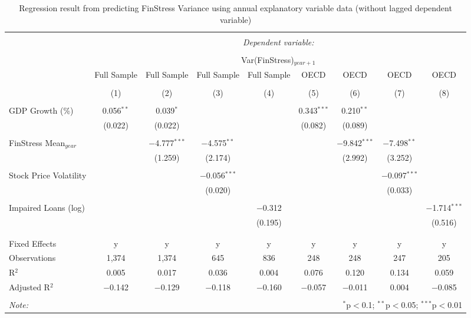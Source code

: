 
\begin{table}[!htbp] \centering 
  \caption{Regression result from predicting FinStress Variance using annual explanatory variable data (without lagged dependent variable)} 
  \label{annual_reg_nolag_dv} 
\tiny 
\begin{tabular}{@{\extracolsep{5pt}}lcccccccc} 
\\[-1.8ex]\hline 
\hline \\[-1.8ex] 
 & \multicolumn{8}{c}{\textit{Dependent variable:}} \\ 
\cline{2-9} 
\\[-1.8ex] & \multicolumn{8}{c}{Var(FinStress)$_{year+1}$} \\ 
 & Full Sample & Full Sample & Full Sample & Full Sample & OECD & OECD & OECD & OECD \\ 
\\[-1.8ex] & (1) & (2) & (3) & (4) & (5) & (6) & (7) & (8)\\ 
\hline \\[-1.8ex] 
 GDP Growth (\%) & 0.056$^{**}$ & 0.039$^{*}$ &  &  & 0.343$^{***}$ & 0.210$^{**}$ &  &  \\ 
  & (0.022) & (0.022) &  &  & (0.082) & (0.089) &  &  \\ 
  & & & & & & & & \\ 
 FinStress Mean$_{year}$ &  & $-$4.777$^{***}$ & $-$4.575$^{**}$ &  &  & $-$9.842$^{***}$ & $-$7.498$^{**}$ &  \\ 
  &  & (1.259) & (2.174) &  &  & (2.992) & (3.252) &  \\ 
  & & & & & & & & \\ 
 Stock Price Volatility &  &  & $-$0.056$^{***}$ &  &  &  & $-$0.097$^{***}$ &  \\ 
  &  &  & (0.020) &  &  &  & (0.033) &  \\ 
  & & & & & & & & \\ 
 Impaired Loans (log) &  &  &  & $-$0.312 &  &  &  & $-$1.714$^{***}$ \\ 
  &  &  &  & (0.195) &  &  &  & (0.516) \\ 
  & & & & & & & & \\ 
\hline \\[-1.8ex] 
Fixed Effects & y & y & y & y & y & y & y & y \\ 
Observations & 1,374 & 1,374 & 645 & 836 & 248 & 248 & 247 & 205 \\ 
R$^{2}$ & 0.005 & 0.017 & 0.036 & 0.004 & 0.076 & 0.120 & 0.134 & 0.059 \\ 
Adjusted R$^{2}$ & $-$0.142 & $-$0.129 & $-$0.118 & $-$0.160 & $-$0.057 & $-$0.011 & 0.004 & $-$0.085 \\ 
\hline 
\hline \\[-1.8ex] 
\textit{Note:}  & \multicolumn{8}{r}{$^{*}$p$<$0.1; $^{**}$p$<$0.05; $^{***}$p$<$0.01} \\ 
\end{tabular} 
\end{table} 
